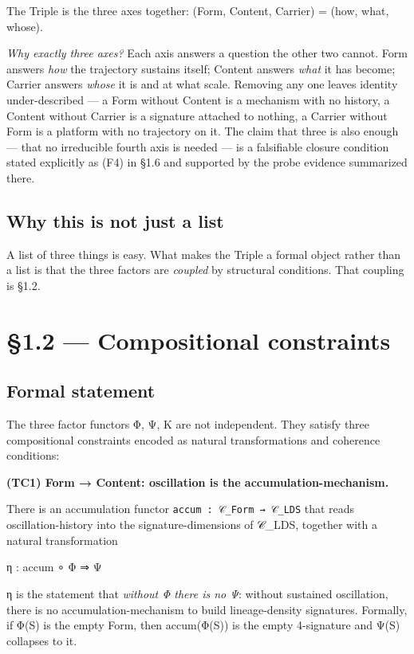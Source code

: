 \documentclass[11pt, openany]{book}
\newcommand{\sectionbreak}{\clearpage}
\begin{document}
The Triple is the three axes together: (Form, Content, Carrier) = (how, what, whose).

\textit{Why exactly three axes?} Each axis answers a question the other two cannot. Form answers \textit{how} the trajectory sustains itself; Content answers \textit{what} it has become; Carrier answers \textit{whose} it is and at what scale. Removing any one leaves identity under-described --- a Form without Content is a mechanism with no history, a Content without Carrier is a signature attached to nothing, a Carrier without Form is a platform with no trajectory on it. The claim that three is also enough --- that no irreducible fourth axis is needed --- is a falsifiable closure condition stated explicitly as (F4) in §1.6 and supported by the probe evidence summarized there.

\subsection{Why this is not just a list}

A list of three things is easy. What makes the Triple a formal object rather than a list is that the three factors are \textit{coupled} by structural conditions. That coupling is §1.2.

\sectionbreak

\section{§1.2 --- Compositional constraints}

\subsection{Formal statement}

The three factor functors Φ, Ψ, Κ are not independent. They satisfy three compositional constraints encoded as natural transformations and coherence conditions:

\textbf{(TC1) Form → Content: oscillation is the accumulation-mechanism.}

There is an accumulation functor \texttt{accum : 𝒞\_Form → 𝒞\_LDS} that reads oscillation-history into the signature-dimensions of 𝒞\_\allowbreak{}LDS, together with a natural transformation

\begin{Code}
η : accum ∘ Φ ⇒ Ψ
\end{Code}

η is the statement that \textit{without Φ there is no Ψ}: without sustained oscillation, there is no accumulation-mechanism to build lineage-density signatures. Formally, if Φ(S) is the empty Form, then accum(Φ(S)) is the empty 4-signature and Ψ(S) collapses to it.
\end{document}
